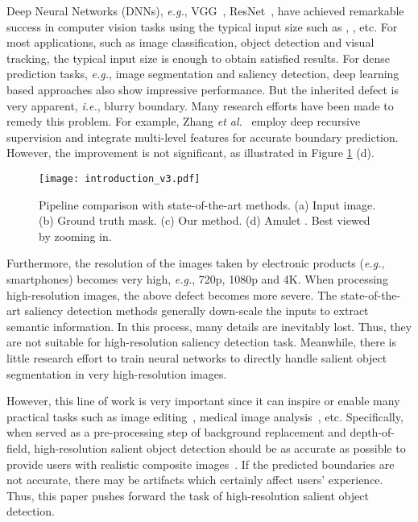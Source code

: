 \documentclass[10pt,twocolumn,letterpaper]{article}
\begin{document}
Deep Neural Networks (DNNs), \emph{e.g.}, VGG~\cite{simonyan2014very}, ResNet~\cite{he2016deep}, have achieved remarkable success in computer vision tasks using the typical input size such as , , etc. For most applications, such as image classification, object detection and visual tracking, the typical input size is enough to obtain satisfied results. For dense prediction tasks, \emph{e.g.}, image segmentation and saliency detection, deep learning based approaches also show impressive performance. But the inherited defect is very apparent, \emph{i.e.}, blurry boundary. Many research efforts have been made to remedy this problem. For example, Zhang \emph{et al.}~\cite{zhang2017amulet} employ deep recursive supervision and integrate multi-level features for accurate boundary prediction.
However, the improvement is not significant, as illustrated in Figure \ref{fig:intro} (d).
\begin{figure}
\centering
\texttt{[image: introduction\_v3.pdf]}\\
\caption{Pipeline comparison with state-of-the-art methods. (a) Input image. (b) Ground truth mask.  (c) Our method. (d) Amulet \cite{zhang2017amulet}. Best viewed by zooming in.}
\label{fig:intro}
\vspace{-5mm}
\end{figure}

Furthermore, the resolution of the images taken by electronic products (\emph{e.g.}, smartphones) becomes very high, \emph{e.g.}, 720p, 1080p and 4K. When processing high-resolution images, the above defect becomes more severe. The state-of-the-art saliency detection methods generally down-scale the inputs to extract semantic information. In this process, many details are inevitably lost. Thus, they are not suitable for high-resolution saliency detection task.
Meanwhile, there is little research effort to train neural networks to directly handle salient object segmentation in very high-resolution images.


However, this line of work is very important since it can inspire or enable many practical tasks such as image editing~\cite{tsai2016sky,xiao2019auto,lischinski2006interactive}, medical image analysis~\cite{chen2019learning}, etc. Specifically, when served as a pre-processing step of background replacement and
depth-of-field, high-resolution salient object detection should be as accurate as possible to provide users with realistic composite images~\cite{shen2016automatic}. If the predicted boundaries are not accurate, there may be artifacts which certainly affect users' experience. Thus, this paper pushes forward the task of high-resolution salient object detection.
\end{document}
